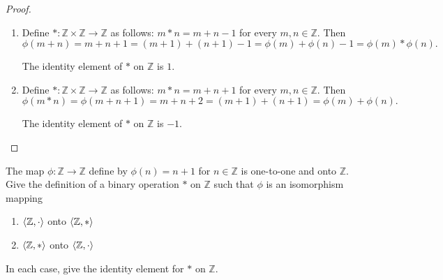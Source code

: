 \begin{proof}
    \begin{enumerate}[label={\textbf{\alph*}},itemsep=0pt,topsep=0pt]
        \item Define $*: \mathbb{Z}\times\mathbb{Z}\to\mathbb{Z}$ as follows: $m * n = m + n - 1$ for every $m, n\in\mathbb{Z}$. Then
              \[
                  \phi(m + n) = m + n + 1 = (m + 1) + (n + 1) - 1 = \phi(m) + \phi(n) - 1 = \phi(m) * \phi(n).
              \]

              The identity element of $*$ on $\mathbb{Z}$ is $1$.
        \item Define $*: \mathbb{Z}\times\mathbb{Z}\to\mathbb{Z}$ as follows: $m * n = m + n + 1$ for every $m, n\in\mathbb{Z}$. Then
              \[
                  \phi(m * n) = \phi(m + n + 1) = m + n + 2 = (m + 1) + (n + 1) = \phi(m) + \phi(n).
              \]

              The identity element of $*$ on $\mathbb{Z}$ is $-1$.
    \end{enumerate}
\end{proof}

\begin{exercise}
    The map $\phi: \mathbb{Z} \to \mathbb{Z}$ define by $\phi(n) = n + 1$ for $n\in\mathbb{Z}$ is one-to-one and onto $\mathbb{Z}$. Give the definition of a binary operation $*$ on $\mathbb{Z}$ such that $\phi$ is an isomorphism mapping
    \begin{enumerate}[label={\textbf{\alph*}},itemsep=0pt,topsep=0pt]
        \item $\left\langle{\mathbb{Z}, \cdot}\right\rangle$ onto $\left\langle{\mathbb{Z}, *}\right\rangle$
        \item $\left\langle{\mathbb{Z}, *}\right\rangle$ onto $\left\langle{\mathbb{Z}, \cdot}\right\rangle$
    \end{enumerate}

    In each case, give the identity element for $*$ on $\mathbb{Z}$.
\end{exercise}

